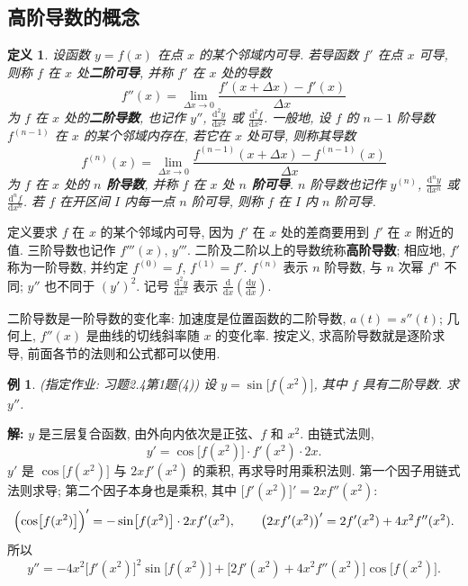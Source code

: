 \documentclass[UTF8,openany]{ctexbook}
\theoremstyle{chinesetextbook}
\newtheorem{example}{例}[section]
\newenvironment{cnsolution}{\par\indent\textbf{解:} \ignorespaces}{\par}
\newtheorem*{definitionsingle}{定义}
\newcommand{\dd}{\mathrm d}
\begin{document}
\subsection{高阶导数的概念}
\begin{definitionsingle}
设函数 $y=f(x)$ 在点 $x$ 的某个邻域内可导. 若导函数 $f'$ 在点 $x$ 可导, 则称 $f$ 在 $x$ 处\textbf{二阶可导}, 并称 $f'$ 在 $x$ 处的导数
\[
f''(x)=\lim_{\Delta x\to0}\frac{f'(x+\Delta x)-f'(x)}{\Delta x}
\]
为 $f$ 在 $x$ 处的\textbf{二阶导数}, 也记作 $y''$, $\displaystyle\frac{\dd^2y}{\dd x^2}$ 或 $\displaystyle\frac{\dd^2f}{\dd x^2}$. 一般地, 设 $f$ 的 $n-1$ 阶导数 $f^{(n-1)}$ 在 $x$ 的某个邻域内存在, 若它在 $x$ 处可导, 则称其导数
\[
f^{(n)}(x)=\lim_{\Delta x\to0}\frac{f^{(n-1)}(x+\Delta x)-f^{(n-1)}(x)}{\Delta x}
\]
为 $f$ 在 $x$ 处的 \textbf{$n$ 阶导数}, 并称 $f$ 在 $x$ 处 \textbf{$n$ 阶可导}. $n$ 阶导数也记作 $y^{(n)}$, $\displaystyle\frac{\dd^ny}{\dd x^n}$ 或 $\displaystyle\frac{\dd^nf}{\dd x^n}$. 若 $f$ 在开区间 $I$ 内每一点 $n$ 阶可导, 则称 $f$ 在 $I$ 内 $n$ 阶可导.
\end{definitionsingle}
定义要求 $f$ 在 $x$ 的某个邻域内可导, 因为 $f'$ 在 $x$ 处的差商要用到 $f'$ 在 $x$ 附近的值. 三阶导数也记作 $f'''(x)$, $y'''$. 二阶及二阶以上的导数统称\textbf{高阶导数}; 相应地, $f'$ 称为一阶导数, 并约定 $f^{(0)}=f$, $f^{(1)}=f'$. $f^{(n)}$ 表示 $n$ 阶导数, 与 $n$ 次幂 $f^n$ 不同; $y''$ 也不同于 $(y')^2$. 记号 $\displaystyle\frac{\dd^2y}{\dd x^2}$ 表示 $\displaystyle\frac{\dd}{\dd x}\left(\frac{\dd y}{\dd x}\right)$.

二阶导数是一阶导数的变化率: 加速度是位置函数的二阶导数, $a(t)=s''(t)$; 几何上, $f''(x)$ 是曲线的切线斜率随 $x$ 的变化率. 按定义, 求高阶导数就是逐阶求导, 前面各节的法则和公式都可以使用.
\begin{example}\label{ex:c2-h4-1a}
\textnormal{(指定作业: 习题2.4第1题(4))} 设 $y=\sin\bigl[f(x^2)\bigr]$, 其中 $f$ 具有二阶导数. 求 $y''$.
\end{example}
\begin{cnsolution}
$y$ 是三层复合函数, 由外向内依次是正弦、$f$ 和 $x^2$. 由链式法则,
\[
y'=\cos\bigl[f(x^2)\bigr]\cdot f'(x^2)\cdot2x.
\]
$y'$ 是 $\cos\bigl[f(x^2)\bigr]$ 与 $2xf'(x^2)$ 的乘积, 再求导时用乘积法则. 第一个因子用链式法则求导; 第二个因子本身也是乘积, 其中 $\bigl[f'(x^2)\bigr]'=2xf''(x^2)$:
\[
\Bigl(\cos\bigl[f(x^2)\bigr]\Bigr)'=-\sin\bigl[f(x^2)\bigr]\cdot2xf'(x^2),\qquad\bigl(2xf'(x^2)\bigr)'=2f'(x^2)+4x^2f''(x^2).
\]
所以
\[
y''=-4x^2\bigl[f'(x^2)\bigr]^2\sin\bigl[f(x^2)\bigr]+\bigl[2f'(x^2)+4x^2f''(x^2)\bigr]\cos\bigl[f(x^2)\bigr].
\]
\end{cnsolution}
\end{document}
